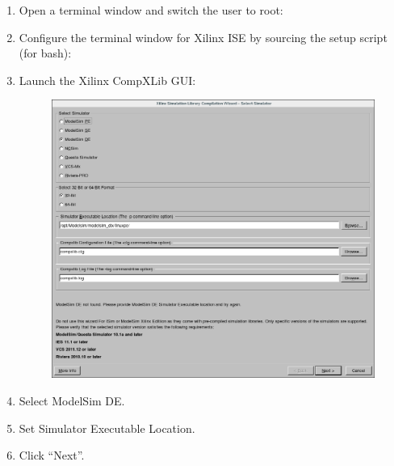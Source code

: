 \begin{flushleft}
	\begin{enumerate}
	 	\item Open a terminal window and switch the user to root:
			\subitem {}
		\item Configure the terminal window for Xilinx ISE by sourcing the setup script (for bash):
			\subitem {}
			\subitem {}
		\item Launch the Xilinx CompXLib GUI:
			\subitem {}
			\subitem {}

	\begin{figure}[H]
	\centering\captionsetup{type=figure}\includegraphics[scale=0.5]{Xilinx_CompXLib_1_Select32bit}
		\label{fig:wizard_page_1}
	\end{figure}

		\item Select ModelSim DE.
		\item Set Simulator Executable Location.
		\item Click ``Next''.


\end{enumerate}
\end{flushleft}
